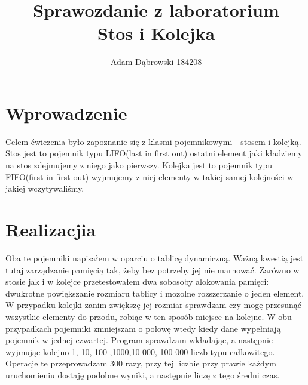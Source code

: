 \documentclass[a4paper,11pt]{report}
\title{\textbf{Sprawozdanie z laboratorium\\Stos i Kolejka}}
\author{Adam Dąbrowski 184208}
\begin{document}
\maketitle
\section{Wprowadzenie}

Celem ćwiczenia było zapoznanie się z klasmi pojemnikowymi - stosem i kolejką. Stos jest to pojemnik typu LIFO(last in first out) ostatni element jaki kładziemy na stos zdejmujemy z niego jako pierwszy. Kolejka jest to pojemnik typu FIFO(first in first out) wyjmujemy z niej elementy w takiej samej kolejności w jakiej wczytywaliśmy.  

\section{Realizacjia}

Oba te pojemniki napisałem w oparciu o tablicę dynamiczną. Ważną kwestią jest tutaj zarządzanie pamięcią tak, żeby bez potrzeby jej nie marnować. 
Zarówno w stosie jak i w kolejce przetestowałem dwa sobosoby alokowania pamięci: dwukrotne powiększanie rozmiaru tablicy i mozolne rozszerzanie o jeden element. W przypadku kolejki zanim zwiększę jej rozmiar sprawdzam czy mogę przesunąć wszystkie elementy do przodu, robiąc w ten sposób miejsce na kolejne. W obu przypadkach pojemniki zmniejszam o połowę wtedy kiedy dane wypełniają pojemnik w jednej czwartej. Program sprawdzam wkładając, a następnie wyjmując kolejno 1, 10, 100 ,1000,10 000, 100 000 liczb typu całkowitego. Operacje te przeprowadzam 300 razy, przy tej liczbie przy prawie każdym uruchomieniu dostaję podobne wyniki, a następnie liczę z tego średni czas. 
\newpage
\end{document}

